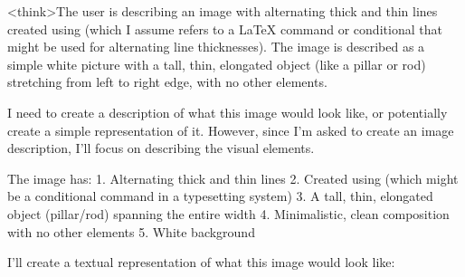 <think>The user is describing an image with alternating thick and thin lines created using \ifodd (which I assume refers to a LaTeX command or conditional that might be used for alternating line thicknesses). The image is described as a simple white picture with a tall, thin, elongated object (like a pillar or rod) stretching from left to right edge, with no other elements.

I need to create a description of what this image would look like, or potentially create a simple representation of it. However, since I'm asked to create an image description, I'll focus on describing the visual elements.

The image has:
1. Alternating thick and thin lines
2. Created using \ifodd (which might be a conditional command in a typesetting system)
3. A tall, thin, elongated object (pillar/rod) spanning the entire width
4. Minimalistic, clean composition with no other elements
5. White background

I'll create a textual representation of what this image would look like:

